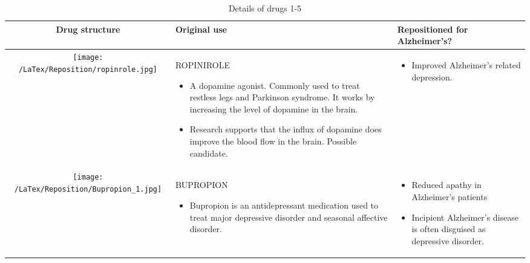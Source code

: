 \documentclass[preprint,12pt]{elsarticle}
\begin{document}
\scriptsize
\begin{table}[h!]
\scriptsize
  \centering \caption{Details of drugs 1-5 }\label{drugs1}
  \begin{tabular}{ | c | m{4.5cm} | m{4.5cm} | }
    \hline
    Drug structure & Original use & Repositioned for Alzheimer's? \\ \hline
    \begin{minipage}{.3\textwidth}
      \texttt{[image: /LaTex/Reposition/ropinrole.jpg]}
    \end{minipage}
    & ROPINIROLE
      \begin{itemize}
         \item A dopamine agonist. Commonly used to treat restless legs and Parkinson syndrome. It works by increasing the level of dopamine in the brain.
        \item Research  supports that the influx of dopamine does improve the blood flow in the brain. Possible candidate.
      \end{itemize}
    & 
      \begin{itemize}
        \item Improved Alzheimer’s related depression.
      \end{itemize}
    \\ \hline
     \begin{minipage}{.3\textwidth}
      \texttt{[image: /LaTex/Reposition/Bupropion\_1.jpg]}
    \end{minipage}
    & BUPROPION
      \begin{itemize}
        \item Bupropion is an antidepressant medication used to treat major depressive disorder and seasonal affective disorder.
         
      \end{itemize}
    & 
      \begin{itemize}
        \item Reduced apathy in Alzheimer's patients 
        \item Incipient Alzheimer's disease is often disguised as depressive disorder.
            \end{itemize}
    \\ \hline
    

\end{tabular}
\end{table}
\end{document}
